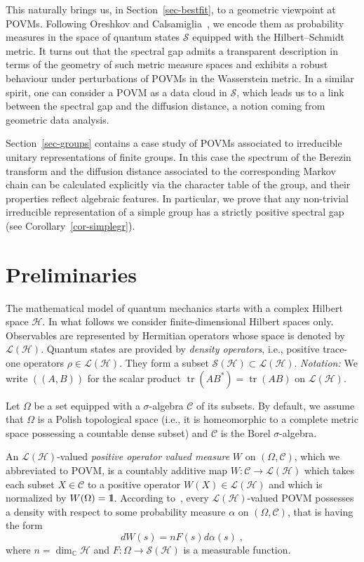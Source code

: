 \documentclass[11pt]{article}
\theoremstyle{definition}
\numberwithin{equation}{section}
\numberwithin{figure}{section}
\numberwithin{table}{section}
\DeclareMathOperator{\tr}{tr}
\newcommand{\CCC}{{\mathbb{C}}}
\newcommand{\cS}{{\mathcal{S}}}
\newcommand*\id{{1\hskip-2.5pt{\rm l}}}
\newcommand{\Hilb}{\mathcal{H}}
\newcommand\< {\mathcal{h}}
\renewcommand\> {\mathcal{i}}
\newcommand*\cC{\mathscr{C}}
\newcommand*\cL{\mathscr{L}}
\begin{document}

This naturally brings us, in Section~\ref{sec-bestfit}, to a geometric viewpoint at POVMs. Following Oreshkov and Calsamiglia~\cite[VII.C]{OC}, we encode them as probability measures in the space of quantum states $\cS$ equipped with the Hilbert--Schmidt metric. It turns out that the spectral gap admits a transparent description in terms of the geometry of such metric measure spaces and exhibits a robust behaviour under perturbations of POVMs in the Wasserstein metric. In a similar spirit, one can consider a POVM as a data cloud in $\cS$, which leads us to a link between the spectral gap and the diffusion distance, a notion coming from geometric data analysis.

Section~\ref{sec-groups} contains a case study of POVMs associated to irreducible unitary representations of finite groups. In this case the spectrum of the Berezin transform and the diffusion distance associated to the corresponding Markov chain can be calculated explicitly via the character table of the group, and their properties reflect algebraic features. In particular, we prove that any non-trivial irreducible representation of a simple group has a strictly positive spectral gap (see Corollary~\ref{cor-simplegr}).


\section{Preliminaries}\label{prel}
The mathematical model of quantum mechanics starts with a complex Hilbert space $\Hilb$. In what follows we consider finite-dimensional Hilbert spaces only. Observables are represented by Hermitian operators whose space is denoted by $\cL(\Hilb)$. Quantum states are provided by \emph{density operators}, i.e., positive trace-one operators $\rho \in \cL(\Hilb)$. They form a subset $\cS(\Hilb) \subset \cL(\Hilb)$.
\emph{Notation:} We write $((A,B))$ for the scalar product $\tr(AB^*)= \tr(AB)$ on $\cL(\Hilb)$.

Let $\Omega$ be a set equipped with a $\sigma$-algebra $\cC$ of its subsets. By default, we assume that $\Omega$ is a Polish topological space (i.e., it is homeomorphic to a complete metric space possessing a countable dense subset) and $\cC$ is the Borel $\sigma$-algebra.

An $\cL(\Hilb)$-valued \emph{positive operator valued measure} $W$ on $(\Omega,\cC)$, which we abbreviated to POVM, is a countably additive map $W\colon \cC \to \cL(\Hilb)$ which takes each subset $X \in \cC$ to a positive operator $W(X) \in \cL(\Hilb)$ and which is normalized by $W(\Omega) = \id$. According to~\cite{CDS}, every $\cL(\Hilb)$-valued POVM possesses a density with respect to some probability measure $\alpha$ on $(\Omega, \cC)$, that is having the form
\begin{equation}\label{eq-POVM-density}
dW(s) = nF(s) d\alpha(s)\;,
\end{equation}
where $n= \dim_{\CCC} \Hilb$ and $F: \Omega \to \cS(\Hilb)$ is a measurable function.
\end{document}

